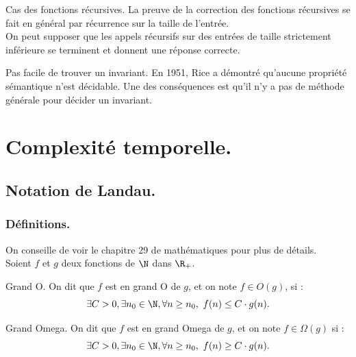 \documentclass[french, 11pt]{article}
\begin{document}
\begin{meth}{Cas des fonctions récursives.}{}
    La preuve de la correction des fonctions récursives se fait en général par récurrence sur la taille de l'entrée.\\
    On peut supposer que les appels récursifs sur des entrées de taille strictement inférieure se terminent et donnent une réponse correcte.
\end{meth}

\begin{defi}{Pas facile de trouver un invariant.}{}
    En 1951, Rice a démontré qu'aucune propriété sémantique n'est décidable. Une des conséquences est qu'il n'y a pas de méthode générale pour décider un invariant.
\end{defi}

\section{Complexité temporelle.}

\subsection{Notation de Landau.}

\subsubsection{Définitions.}

On conseille de voir le chapitre 29 de mathématiques pour plus de détails.\\
Soient $f$ et $g$ deux fonctions de $\N$ dans $\R_+$.

\begin{defi}{Grand O.}{}
    On dit que $f$ est en grand O de $g$, et on note $f\in O(g)$, si :
    \begin{equation*}
        \exists C>0, \exists n_0\in\N, \forall n\geq n_0, ~ f(n)\leq C\cdot g(n).
    \end{equation*}
\end{defi}

\vspace*{-0.3cm}

\begin{defi}{Grand Omega.}{}
    On dit que $f$ est en grand Omega de $g$, et on note $f\in\Omega(g)$ si :
    \begin{equation*}
        \exists C>0, \exists n_0\in\N, \forall n\geq n_0, ~ f(n)\geq C\cdot g(n).
    \end{equation*}
\end{defi}
\end{document}
